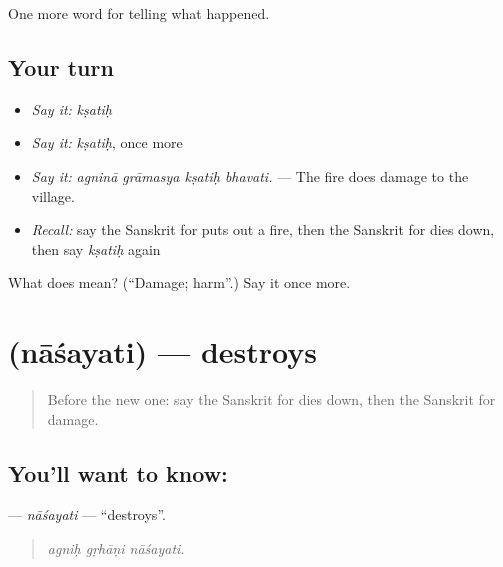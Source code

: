 \begin{grammarlens}[title={What you've built}]
One more word for telling what happened.
\end{grammarlens}

\subsection*{Your turn}
\begin{itemize}
\raggedright
  \item \emph{Say it:} \emph{kṣatiḥ}
  \item \emph{Say it:} \emph{kṣatiḥ}, once more
  \item \emph{Say it:} \emph{agninā grāmasya kṣatiḥ bhavati.} — The fire does damage to the village.
  \item \emph{Recall:} say the Sanskrit for puts out a fire, then the Sanskrit for dies down, then say \emph{kṣatiḥ} again
\end{itemize}

\begin{tcolorbox}[breakable,colback=teal!4,colframe=teal!35!black,title={Before you move on}]
What does  mean? (\textquotedblleft{}Damage; harm\textquotedblright{}.) Say it once more.
\end{tcolorbox}
\section[\texorpdfstring{\sk{नाशयति} (nāśayati)}{नाशयति (nāśayati)}]{ (nāśayati) — destroys}

\label{lesson:SA-C298-nasayati}



\begin{quote}
Before the new one: say the Sanskrit for dies down, then the Sanskrit for damage.
\end{quote}

\subsection*{You'll want to know: }
\textbf{} — \emph{nāśayati} — \textquotedblleft{}destroys\textquotedblright{}.

\begin{quote}
  
\end{quote}

\begin{quote}
\emph{agniḥ gṛhāṇi nāśayati.}
\end{quote}

